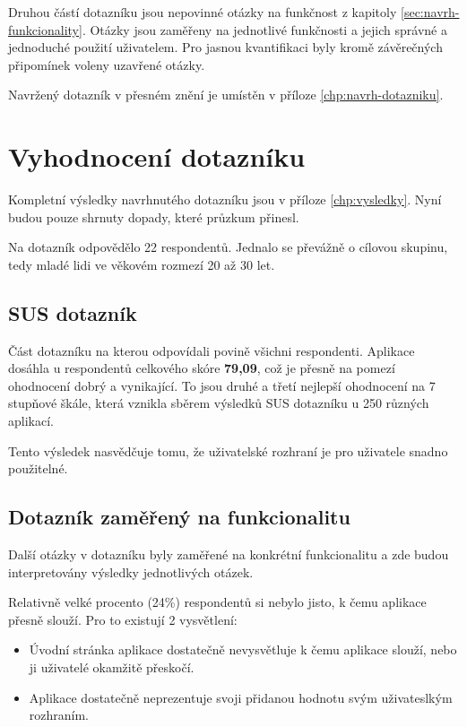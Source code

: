 Druhou částí dotazníku jsou nepovinné otázky na funkčnost z kapitoly \ref{sec:navrh-funkcionality}. Otázky jsou zaměřeny na jednotlivé funkčnosti a jejich správné a jednoduché použití uživatelem. Pro jasnou kvantifikaci byly kromě závěrečných připomínek voleny uzavřené otázky.

Navržený dotazník v přesném znění je umístěn v příloze \ref{chp:navrh-dotazniku}.


\section{Vyhodnocení dotazníku}
\label{sec:vyhodnoceni-dotazniku}
Kompletní výsledky navrhnutého dotazníku jsou v příloze \ref{chp:vysledky}. Nyní budou pouze shrnuty dopady, které průzkum přinesl.

Na dotazník odpovědělo 22 respondentů. Jednalo se převážně o cílovou skupinu, tedy mladé lidi ve věkovém rozmezí 20 až 30 let.

\subsection{SUS dotazník}
Část dotazníku na kterou odpovídali povině všichni respondenti. Aplikace dosáhla u respondentů celkového skóre \textbf{79,09}, což je přesně na pomezí ohodnocení dobrý a vynikající\cite{bangor2009determining}. To jsou druhé a třetí nejlepší ohodnocení na 7 stupňové škále, která vznikla sběrem výsledků SUS dotazníku u 250 různých aplikací\cite{bangor2009determining}.

Tento výsledek nasvědčuje tomu, že uživatelské rozhraní je pro uživatele snadno použitelné.

\subsection{Dotazník zaměřený na funkcionalitu}
Další otázky v dotazníku byly zaměřené na konkrétní funkcionalitu a zde budou interpretovány výsledky jednotlivých otázek.

Relativně velké procento (24\%) respondentů si nebylo jisto, k čemu aplikace přesně slouží. Pro to existují 2 vysvětlení:
\begin{itemize}
\item Úvodní stránka aplikace dostatečně nevysvětluje k čemu aplikace slouží, nebo ji uživatelé okamžitě přeskočí.
\item Aplikace dostatečně neprezentuje svoji přidanou hodnotu svým uživateslkým rozhraním.
\end{itemize}

